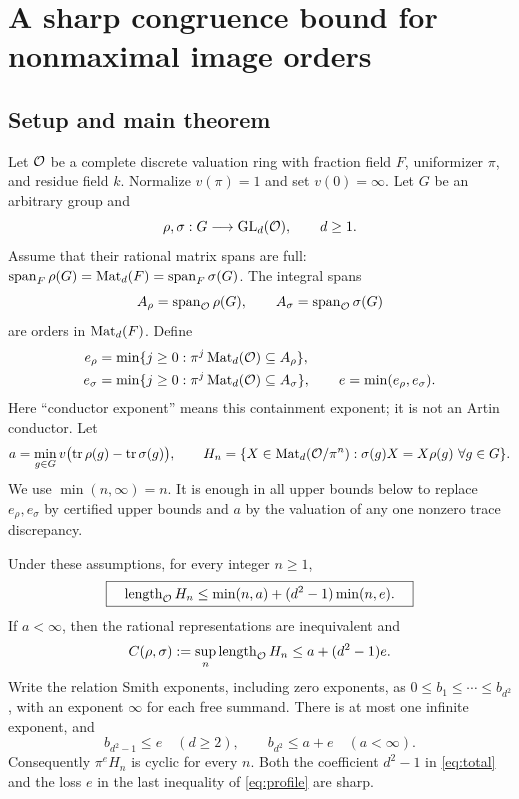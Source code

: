 \section{A sharp congruence bound for nonmaximal image orders}
\label{order:sec:main}

\subsection{Setup and main theorem}

Let $\mathcal O$ be a complete discrete valuation ring with fraction field $F$,
uniformizer $\pi$, and residue field $k$. Normalize $v(\pi)=1$ and set
$v(0)=\infty$. Let $G$ be an arbitrary group and
\[
 \rho,\sigma:G\longrightarrow\operatorname{GL}_d(\mathcal O),\qquad d\ge1.
\]
Assume that their rational matrix spans are full:
$\operatorname{span}_F\rho(G)=\operatorname{Mat}_d(F)=\operatorname{span}_F\sigma(G)$.
The integral spans
\[
 A_\rho=\operatorname{span}_{\mathcal O}\rho(G),\qquad A_\sigma=\operatorname{span}_{\mathcal O}\sigma(G)
\]
are orders in $\operatorname{Mat}_d(F)$. Define
\[
 \begin{aligned}
 e_\rho&=\min\{j\ge0:\pi^j\operatorname{Mat}_d(\mathcal O)\subseteq A_\rho\},\\
 e_\sigma&=\min\{j\ge0:\pi^j\operatorname{Mat}_d(\mathcal O)\subseteq A_\sigma\},\qquad
 e=\min(e_\rho,e_\sigma).
 \end{aligned}
\]
Here ``conductor exponent'' means this containment exponent; it is not
an Artin conductor. Let
\[
 a=\min_{g\in G}v\bigl(\operatorname{tr}\rho(g)-\operatorname{tr}\sigma(g)\bigr),\qquad
 H_n=\{X\in\operatorname{Mat}_d(\mathcal O/\pi^n):\sigma(g)X=X\rho(g)\ \forall g\in G\}.
\]
We use $\min(n,\infty)=n$. It is enough in all upper bounds below to
replace $e_\rho,e_\sigma$ by certified upper bounds and $a$ by the
valuation of any one nonzero trace discrepancy.

\begin{theorem}\label{thm:main}
Under these assumptions, for every integer $n\ge1$,
\begin{equation}\label{eq:main}
 \boxed{\quad \operatorname{length}_{\mathcal O}H_n\le
 \min(n,a)+(d^2-1)\min(n,e).\quad}
\end{equation}
If $a<\infty$, then the rational representations are inequivalent and
\begin{equation}\label{eq:total}
 C(\rho,\sigma):=\sup_n\operatorname{length}_{\mathcal O}H_n
 \le a+(d^2-1)e.
\end{equation}
Write the relation Smith exponents, including zero exponents, as
$0\le b_1\le\cdots\le b_{d^2}$, with an exponent $\infty$ for each free
summand. There is at most one infinite exponent, and
\begin{equation}\label{eq:profile}
 b_{d^2-1}\le e\quad(d\ge2),\qquad
 b_{d^2}\le a+e\quad(a<\infty).
\end{equation}
Consequently $\pi^eH_n$ is cyclic for every $n$. Both the coefficient
$d^2-1$ in \eqref{eq:total} and the loss $e$ in the last inequality of
\eqref{eq:profile} are sharp.
\end{theorem}


